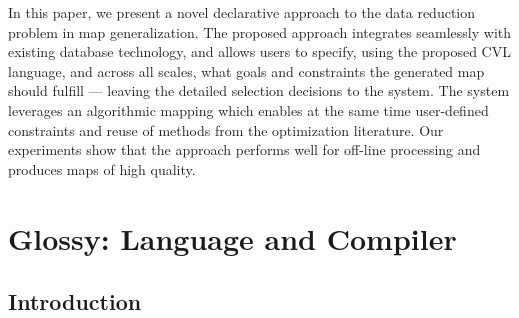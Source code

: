 \documentclass[11pt, oneside]{report}
\begin{document}
{In this paper, we present a novel declarative approach to the data reduction problem in map generalization. 
The proposed approach integrates seamlessly with existing database technology, and allows users to specify, using the proposed CVL language, and across all scales, what goals and constraints the generated map should fulfill --- leaving the detailed selection decisions to the system. The system leverages an algorithmic mapping which enables at the same time user-defined constraints and reuse of methods from the optimization literature. Our experiments show that the approach performs well for off-line processing and produces maps of high quality.





\chapter{Glossy: Language and Compiler}
\label{chapter:glossy}
\lstset{
  language=sql
}


\section{Introduction}
\label{sec:glossy:introduction}

}
\end{document}
